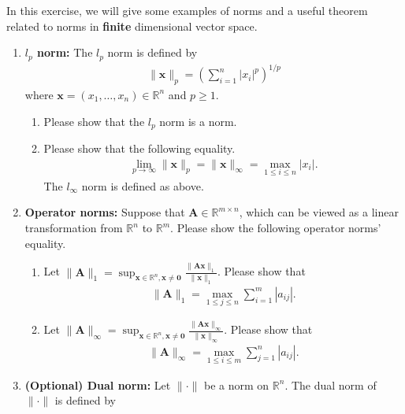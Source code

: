 \documentclass[11pt,letter,notitlepage]{article}
\theoremstyle{definition}
\begin{document}
\newpage

\begin{exercise}[Norms]
    In this exercise, we will give some examples of norms and a useful theorem related to norms in \textbf{finite} dimensional vector space.
    \begin{enumerate}
        \item \textbf{$l_p$ norm:} The $l_p$ norm is defined by
        \begin{align*}
			\|\mathbf{x}\|_p = \left(\sum_{i=1}^n |x_i|^p\right)^{1/p}
		\end{align*}
		where $\mathbf{x}=(x_1,\dots,x_n)\in \mathbb{R}^n$ and $p\ge 1$. 
		\begin{enumerate}
			\item Please show that the $l_p$ norm is a norm.
			\item Please show that the following equality.
			\begin{align*}
				\lim_{p\rightarrow \infty}\|\mathbf{x}\|_p = \|\mathbf{x}\|_{\infty} = \max_{1\le i\le n}|x_i|.
			\end{align*}
			The $l_{\infty}$ norm is defined as above.
		\end{enumerate}
		\item \textbf{Operator norms:} Suppose that $\mathbf{A}\in \mathbb{R}^{m\times n}$, which can be viewed as a linear transformation from $\mathbb{R}^n$ to $\mathbb{R}^m$. Please show the following operator norms' equality.
		\begin{enumerate}
			\item Let $\|\mathbf{A}\|_1 = \sup_{\mathbf{x}\in \mathbb{R}^n, \mathbf{x}\not=\mathbf{0}}\frac{\|\mathbf{Ax}\|_1}{\|\mathbf{x}\|_1}$. Please show that
			\begin{align*}
				\|\mathbf{A}\|_1 = \max_{1\le j\le n}\sum_{i=1}^m|a_{ij}|.
			\end{align*}
			\item Let $\|\mathbf{A}\|_{\infty} = \sup_{\mathbf{x}\in \mathbb{R}^n, \mathbf{x}\not=\mathbf{0}}\frac{\|\mathbf{Ax}\|_{\infty}}{\|\mathbf{x}\|_{\infty}}$. Please show that
			\begin{align*}
				\|\mathbf{A}\|_{\infty} = \max_{1\le i\le m}\sum_{j=1}^n|a_{ij}|.
			\end{align*}
		\end{enumerate}
		\item \textbf{(Optional) Dual norm:} Let $\|\cdot\|$ be a norm on $\mathbb{R}^n$. The dual norm of $\|\cdot\|$ is defined by
		\begin{align*}

\end{align*}
\end{enumerate}
\end{exercise}
\end{document}
